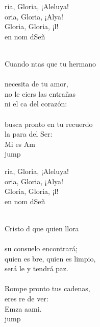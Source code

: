 \begin{cancion}%
	\begin{chorus}%
	ria, Gloria, ¡Aleluya!\\
	oria, Gloria, ¡Alya!\\
	Gloria, Gloria, ¡l!\\
	en nom dSeñ \\
	\end{chorus}%
	\jump\\
	Cuando ntas que tu hermano\\
	\jump\\
necesita de tu amor,\\
	no le ciers las entrañas\\
	ni el ca del corazón:\\
	\jump\\
busca pronto en tu recuerdo\\
	la para del Ser:\\
	Mi  es  Am\\jump\\
	\begin{chorus}%
	ria, Gloria, ¡Aleluya!\\
	oria, Gloria, ¡Alya!\\
	Gloria, Gloria, ¡l!\\
	en nom dSeñ \\
	\end{chorus}%
	\jump\\
	Cristo d que quien llora\\
	\jump\\
su consuelo encontrará;\\
	quien es bre, quien es limpio,\\
	será le y tendrá paz.\\
	\jump\\
Rompe pronto tus cadenas,\\
	eres re de ver:\\
	Emza aami.\\jump\\

\end{cancion}
